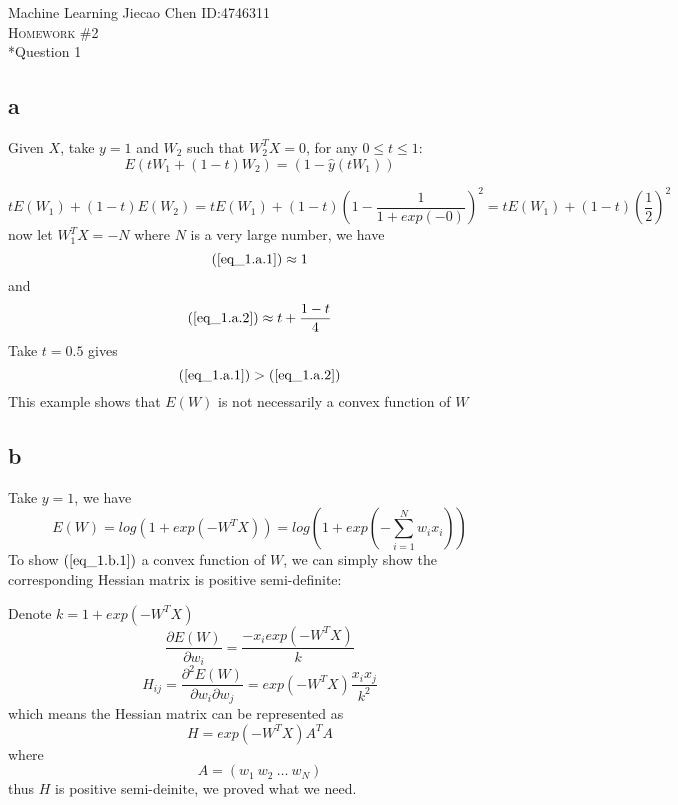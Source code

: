\documentclass[12pt]{amsart}
\makeatletter
\renewcommand{\section}{\@startsection{section}{1}{0mm}
{-\baselineskip}{0.5\baselineskip}{\bf\leftline}}
\makeatother
\begin{document}
\noindent Machine Learning \hfill Jiecao Chen \hfill ID:4746311 \\
\textsc{Homework \#2}\\



\section*{Question 1} 
\subsection*{a}
Given $X$,
take $y=1$ and $W_2$ such that $W_2^TX = 0$, for any $0 \leq t \leq 1$:
\begin{equation}
\label{eq_1.a.1}
	E(tW_1 + (1-t)W_2) = (1 - \hat{y}(tW_1)) 
\end{equation}

\begin{equation}
\label{eq_1.a.2}
	tE(W_1) + (1-t)E(W_2) = tE(W_1) + (1-t)(1 - \frac{1}{1 + exp(-0)})^2 = tE(W_1) + (1 - t) (\frac{1}{2})^2
\end{equation}	
now let $W_1^TX = -N$ where $N$ is a very large number,
we have 
$$(\ref{eq_1.a.1}) \approx 1$$
and 
$$(\ref{eq_1.a.2}) \approx t + \frac{1-t}{4}$$
Take $t = 0.5$ gives
$$ (\ref{eq_1.a.1}) > (\ref{eq_1.a.2})$$
This example shows that $E(W)$ is not necessarily a convex function of $W$


\subsection*{b}
Take $y = 1$, we have
\begin{equation}
\label{eq_1.b.1}
	E(W)  = log(1 + exp(-W^TX)) 
		  = log(1 + exp(-\sum_{i=1}^Nw_ix_i))
\end{equation}
To show $(\ref{eq_1.b.1})$ a convex function of $W$, we can simply show the corresponding Hessian matrix is 
positive semi-definite:

Denote $k = 1 + exp(-W^TX)$
\begin{equation}
	\frac{\partial E(W)}{\partial w_i} = \frac{-x_i exp(-W^TX)}{k}
\end{equation}
\begin{equation}
	H_{ij} = \frac{\partial^2 E(W)}{\partial w_i \partial w_j} = exp(-W^TX) \frac{x_ix_j}{k^2}
\end{equation}
which means the Hessian matrix can be represented as
$$
	H = exp(-W^TX) A^TA
$$
where
$$
	A = (w_1~ w_2~ \ldots~ w_N)
$$
thus $H$ is positive semi-deinite, we proved what we need.
\end{document}
